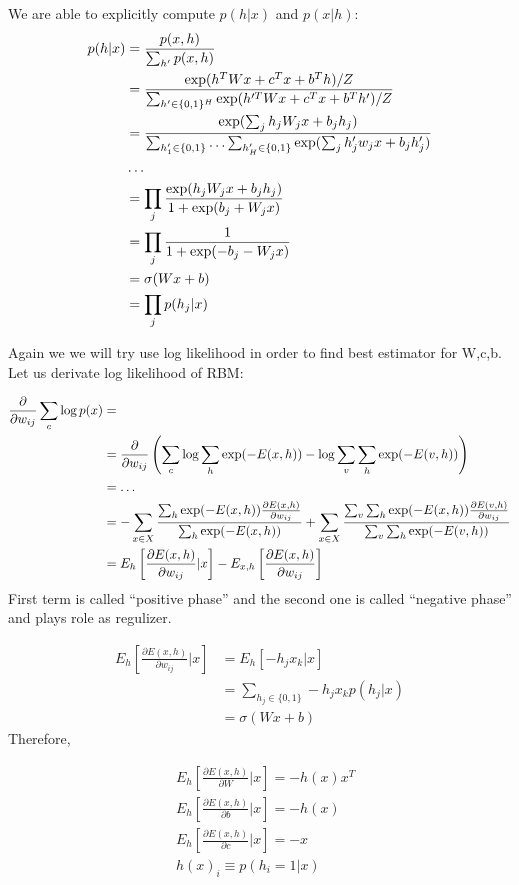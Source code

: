 We are able to explicitly compute $p(h|x)$ and $p(x|h)$:
\begin{align}
	p(h|x)&=\frac{p(x,h)}{\operatorname*{\sum}_{h'}p(x,h)} \\
	&= \frac{\exp(h^TWx+c^Tx+b^Th)/Z}{\operatorname*{\sum}_{h' \in \{0,1\}^H} \exp(h'^TWx+c^Tx+b^Th')/Z} \\
	&= \frac{\exp(\operatorname*{\sum}_j h_jW_jx + b_jh_j)}{\operatorname*{\sum}_{h_1' \in \{0,1\}} \ldots \operatorname*{\sum}_{h_H' \in \{0,1\}} \exp(\operatorname*{\sum}_j h_j' w_jx+b_jh_j')} \\
	& \ldots \\
	& =  \prod_j \frac{\exp(h_jW_jx + b_j h_j)}{1+\exp(b_j + W_j x)} \\
	& =  \prod_j \frac{1}{1+\exp(-b_j-W_jx)} \\
	& =  \sigma(Wx+b) \\
	& = \prod_j p(h_j|x)
\end{align}

Again we we will try use log likelihood in order to find best estimator for W,c,b. Let us derivate log likelihood of RBM:

\begin{align}
	\frac{\partial}{\partial w_{ij}} \operatorname*{\sum}_c \log p(x) & = \\
	&= \frac{\partial}{\partial w_{ij}} \left( \sum_c \log \sum_h \exp(-E(x,h)) - \log \sum_v \sum_h \exp(-E(v,h))   \right) \\
	&= \ldots \\
	&=  - \sum_{x \in X} \frac{\operatorname*{\sum}_h \exp(-E(x,h)) \frac{\partial E(x,h)}{\partial w_{ij}}}{\operatorname*{\sum}_h \exp(-E(x,h))}
	+ \sum_{x \in X} \frac{\operatorname*{\sum}_v \operatorname*{\sum}_h \exp(-E(x,h)) \frac{\partial E(v,h)}{\partial w_{ij}}}{\operatorname*{\sum}_v \operatorname*{\sum}_h \exp(-E(v,h))} \\ 
	& = E_h\left[\frac{\partial E(x,h)}{\partial w_{ij}} | x\right] - E_{x,h}\left[\frac{\partial E(x,h)}{\partial w_{ij}} \right]
\end{align}
First term is called ``positive phase'' and the second one is called ``negative phase'' and plays role as regulizer. 

\begin{align} 
	E_h\left[\frac{\partial E(x,h)}{\partial w_{ij}} | x\right] &  = E_h\left[-h_j x_k|x \right]  \\
	& = \sum_{h_j \in \{0,1\}} -h_jx_k p(h_j|x)  \\
	& = \sigma(Wx+b)
\end{align}
Therefore,

\begin{align} 
	& E_h\left[\frac{\partial E(x,h)}{\partial W} | x\right] =  -h(x)x^T \\
	& E_h\left[\frac{\partial E(x,h)}{\partial b} | x\right] =  -h(x) \\
	& E_h\left[\frac{\partial E(x,h)}{\partial c} | x\right] =  -x \\
	& h(x)_i \equiv p(h_i=1|x)
\end{align}

